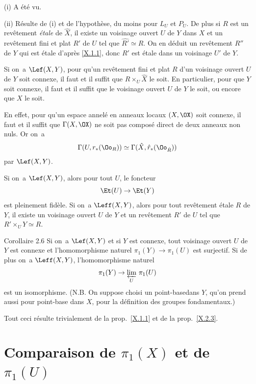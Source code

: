 (i) A \'et\'e vu.

(ii) R\'esulte de (i) et de l'hypoth\`ese, du moins pour $L_U$ et $P_U$. De plus si $R$ est un rev\^etement \emph{étale} de $\hat{X}$, il existe un voisinage ouvert $U$ de $Y$ dans $X$ et un rev\^etement fini et plat $R'$ de $U$ tel que $\widehat{R'} \simeq R$. On en d\'eduit un rev\^etement $R''$ de $Y$ qui est \'etale d'apr\`es \ref{X.1.1}, donc $R'$ est \'etale dans un voisinage $U'$ de $Y$. \cqfd

\begin{corollaire} \label{X.2.4}
Si on~a $\Lef (X, Y)$, pour qu'un rev\^etement fini et plat $R$ d'un voisinage ouvert $U$ de $Y$ soit connexe, il faut et il suffit que $R \times_U \hat{X}$ le soit. En particulier, pour que $Y$ soit connexe, il faut et il suffit que le voisinage ouvert $U$ de $Y$ le soit, ou encore que $X$ le soit.
\end{corollaire}

En effet, pour qu'un espace annel\'e en anneaux locaux $(X, \OX)$ soit connexe, il faut et il suffit que $\Gamma(X, \OX)$ ne soit pas compos\'e direct de deux anneaux non nuls. Or on~a
\[
\Gamma(U, r_\ast(\Oo_R)) \simeq \Gamma(\hat{X}, \hat{r}_\ast(\Oo_{\hat{R}}))
\]
par $\Lef(X, Y)$.

\begin{corollaire} \label{X.2.5} Si on~a $\Lef (X, Y)$, alors pour tout $U$, le foncteur
\[
\Et(U) \to \Et(Y)
\]
est pleinement fid\`ele. Si on~a $\Leff(X, Y)$, alors pour tout rev\^etement \'etale $R$ de $Y$, il existe un voisinage ouvert $U$ de $Y$ et un rev\^etement $R'$ de $U$ tel que $R' \times_U Y \simeq R$.
\end{corollaire}

\label{X.2.6}
\begin{enonce*}{Corollaire 2.6\ndemark}
Si on~a $\Lef(X, Y)$ et si $Y$ est connexe, tout voisinage ouvert $U$ de $Y$ est connexe et l'homomorphisme naturel $\pi_1(Y)\to\pi_1(U)$ est surjectif. Si de plus on~a $\Leff(X, Y)$, l'homomorphisme naturel
\[
\pi_1(Y) \to \varprojlim_{U}\, \pi_1(U)
\]
est un isomorphisme. (N.B. On suppose choisi un \og point-base\fg dans $Y$, qu'on prend aussi pour point-base dans $X$, pour la d\'efinition des groupes fondamentaux.)
\end{enonce*}

Tout ceci r\'esulte trivialement de la prop.\, \ref{X.1.1} et de la prop.\, \ref{X.2.3}.


\section{Comparaison de $\pi_1(X)$ et de $\pi_1(U)$} \label{X.3}


